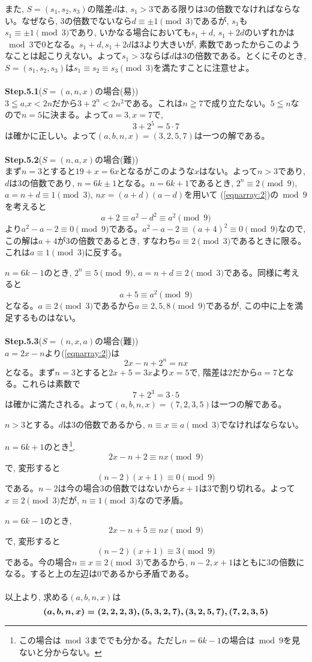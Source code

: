 \documentclass[twocolumn]{jbook}
\theoremstyle{definition}
\newcommand{\bolm}[1]{{\mbox{\boldmath $#1$}}}
\renewcommand{\leq}{\leqq}
\renewcommand{\geq}{\geqq}
\newcommand{\step}[2]{{\large \textbf{Step.#1}}(#2)}
\begin{document}
また, $S=(s_1,s_2,s_3)$の階差$d$は, $s_1>3$である限りは3の倍数でなければならない。なぜなら, $3$の倍数でないなら$d\equiv \pm 1\pmod{3}$であるが, $s_1$も$s_1\equiv \pm 1 \pmod{3}$であり, いかなる場合においても$s_1+d$, $s_1+2d$のいずれかは$\bmod{3}$で0となる。$s_1+d,s_1+2d$は3より大きいが, 素数であったからこのようなことは起こりえない。よって$s_1>3$ならば$d$は3の倍数である。とくにそのとき,  $S=(s_1,s_2,s_3)$は$s_1\equiv s_2\equiv s_3\pmod{3}$を満たすことに注意せよ。\\
\\
\step{5.1}{$S=(a,n,x)$の場合(易)}\\
$3\leq a$,$x<2n$だから$3+2^{n} < 2n^2$である。これは$n\geq 7$で成り立たない。$5\leq n$なので$n=5$に決まる。よって$a=3,x=7$で, 
\[3+2^{5} = 5\cdot 7\]
は確かに正しい。よって$(a,b,n,x) = (3,2,5,7)$は一つの解である。\\
\\
\step{5.2}{$S=(n,a,x)$の場合(難)}\\
まず$n=3$とすると$19+x = 6x$となるがこのような$x$はない。よって$n>3$であり, $d$は3の倍数であり, $n=6k\pm 1$となる。$n=6k+1$であるとき, $2^{n} \equiv 2\pmod{9}$, $a = n+d \equiv 1\pmod{3}$, $nx = (a+d)(a-d)$を用いて (\ref{eqnarray:2})の$\bmod{9}$を考えると
\[a+2 \equiv a^2 - d^2 \equiv a^2 \pmod{9}  \]
より$a^2 - a-2\equiv 0 \pmod{9}$である。$a^2 - a-2\equiv (a+4)^2 \equiv 0\pmod{9}$なので, この解は$a+4$が3の倍数であるとき, すなわち$a\equiv 2\pmod{3}$であるときに限る。これは$a\equiv 1\pmod{3}$に反する。\par
$n=6k-1$のとき, $2^{n} \equiv 5\pmod{9}$, $a = n+d\equiv 2\pmod{3}$である。同様に考えると
\[a+5\equiv a^2 \pmod{9}\]
となる。$a\equiv 2\pmod{3}$であるから$a\equiv 2,5,8\pmod{9}$であるが, この中に上を満足するものはない。\\
\\
\step{5.3}{$S=(n,x,a)$の場合(難)}\\
$a=2x - n$より(\ref{eqnarray:2})は
\[2x - n + 2^{n} = nx\]
となる。まず$n=3$とすると$2x + 5 = 3x$より$x=5$で, 階差は$2$だから$a=7$となる。これらは素数で
\[7 + 2^{3} = 3\cdot 5\]
は確かに満たされる。よって$(a,b,n,x) = (7,2,3,5)$は一つの解である。\par
$n>3$とする。$d$は$3$の倍数であるから, $n\equiv x \equiv a \pmod{3}$でなければならない。\par
$n=6k+1$のとき\footnote{この場合は$\bmod{3}$まででも分かる。ただし$n=6k-1$の場合は$\bmod{9}$を見ないと分からない。}, 
\[2x - n + 2 \equiv nx \pmod{9}\]
で, 変形すると
\[(n-2)(x+1)\equiv 0 \pmod{9}\]
である。$n-2$は今の場合$3$の倍数ではないから$x+1$は$3$で割り切れる。よって$x\equiv 2\pmod{3}$だが, $n\equiv 1\pmod{3}$なので矛盾。\par
$n=6k-1$のとき, 
\[2x - n + 5 \equiv nx \pmod{9}\]
で, 変形すると
\[(n-2)(x+1) \equiv 3\pmod{9}\]
である。今の場合$n\equiv x\equiv 2\pmod{3}$であるから, $n-2, x+1$はともに3の倍数になる。すると上の左辺は$0$であるから矛盾である。\\
\\
以上より, 求める$(a,b,n,x)$は
\[\bolm{(a,b,n,x) = (2,2,2,3),(5,3,2,7),(3,2,5,7),(7,2,3,5)}\]
\end{document}
